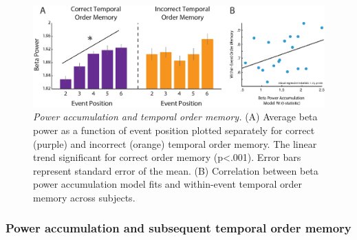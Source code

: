 \begin{figure}
  \centering
  \includegraphics[width=\textwidth]{figures/chapter2_figure4.eps}
  \caption[Power accumulation and temporal order memory]{\textit{Power accumulation and temporal order memory.} (A) Average beta power as a function of event position plotted separately for correct (purple) and incorrect (orange) temporal order memory.  The linear trend significant for correct order memory (p<.001). Error bars represent standard error of the mean. (B)  Correlation between beta power accumulation model fits and within-event temporal order memory across subjects.}
  \label{chapter2_figure4}
\end{figure}

\subsubsection{Power accumulation and subsequent temporal order
memory}\label{power-accumulation-and-subsequent-temporal-order-memory}

